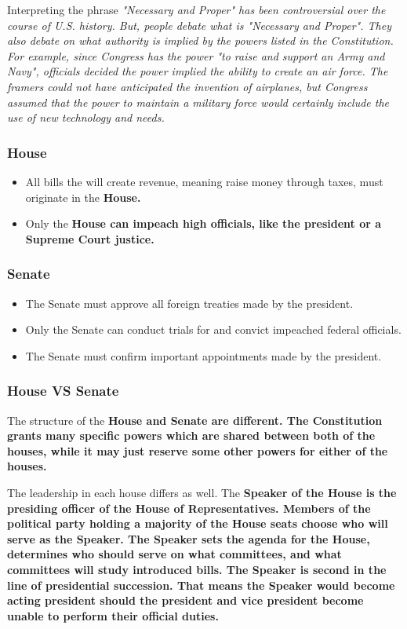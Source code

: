 Interpreting the phrase \it{"Necessary and Proper"} has been controversial over the course of U.S. history. But, people debate what is \it{"Necessary and Proper"}. They also debate on what authority is implied by the powers listed in the Constitution. For example, since Congress has the power \it{"to raise and support an Army and Navy"}, officials decided the power implied the ability to create an air force. The framers could not have anticipated the invention of airplanes, but Congress assumed that the power to maintain a military force would certainly include the use of new technology and needs.

\subsubsection*{House}

\begin{itemize}
    \item All bills the will create revenue, meaning raise money through taxes, must originate in the \bf{House}.
    \item Only the \bf{House} can impeach high officials, like the president or a Supreme Court justice.
\end{itemize}

\subsubsection*{Senate}

\begin{itemize}
    \item The Senate must approve all foreign treaties made by the president.
    \item Only the Senate can conduct trials for and convict impeached federal officials.
    \item The Senate must confirm important appointments made by the president.
\end{itemize}

\subsubsection*{House VS Senate}

The structure of the \bf{House} and \bf{Senate} are different. The Constitution grants many specific powers which are shared between both of the houses, while it may just reserve some other powers for either of the houses.

The leadership in each house differs as well. The \bf{Speaker of the House} is the presiding officer of the \bf{House of Representatives}. Members of the political party holding a majority of the \bf{House} seats choose who will serve as the \bf{Speaker}. The \bf{Speaker} sets the agenda for the \bf{House}, determines who should serve on what committees, and what committees will study introduced bills. The \bf{Speaker} is second in the line of presidential succession. That means the Speaker would become acting president should the president and vice president become unable to perform their official duties.

